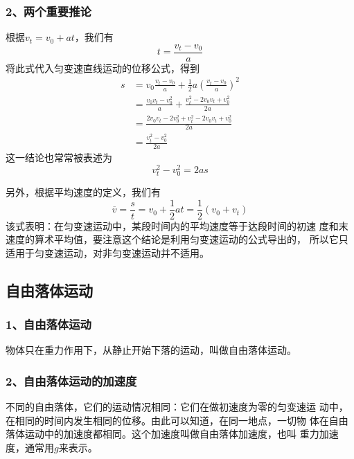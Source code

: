 \subsubsection*{2、两个重要推论}
根据$v_t=v_0+at$，我们有 
\begin{equation}
    t=\frac{v_t-v_0}{a}
\end{equation}
将此式代入匀变速直线运动的位移公式，得到
\begin{equation}
    \begin{aligned}
        s&=v_0\frac{v_t-v_0}{a}+\frac{1}{2}a\left(\frac{v_t-v_0}{a}\right)^2\\
        &=\frac{v_0v_t-v_0^2}{a}+\frac{v_t^2-2v_0v_t+v_0^2}{2a}\\
        &=\frac{2v_0v_t-2v_0^2+v_t^2-2v_0v_t+v_0^2}{2a}\\
        &=\frac{v_t^2-v_0^2}{2a}
    \end{aligned}
\end{equation}
这一结论也常常被表述为
\begin{equation}
    v_t^2-v_0^2=2as
\end{equation}

另外，根据平均速度的定义，我们有 
\begin{equation}
    \overline{v}=\frac{s}{t}=v_0+\frac{1}{2}at=\frac{1}{2}(v_0+v_t)
\end{equation}
该式表明：在匀变速运动中，某段时间内的平均速度等于达段时间的初速
度和末速度的算术平均值，要注意这个结论是利用匀变速运动的公式导出的，
所以它只适用于匀变速运动，对非匀变速运动并不适用。
\subsection{自由落体运动}
\subsubsection*{1、自由落体运动}
\begin{definition}
    物体只在重力作用下，从静止开始下落的运动，叫做自由落体运动。
\end{definition}

\subsubsection*{2、自由落体运动的加速度}
\begin{definition}
    不同的自由落体，它们的运动情况相同：它们在做初速度为零的匀变速运
    动中，在相同的时间内发生相同的位移。由此可以知道，在同一地点，一切物
    体在自由落体运动中的加速度都相同。这个加速度叫做自由落体加速度，也叫
    重力加速度，通常用$ g $来表示。
\end{definition}

